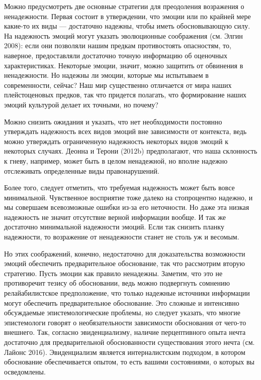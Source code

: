 \documentclass[11pt]{book}
\begin{document}
Можно предусмотреть две основные стратегии для преодоления возражения о ненадежности. Первая состоит в утверждении, что эмоции или по крайней мере какие-то их виды --- достаточно надежны, чтобы иметь обосновывающую силу. На надежность эмоций могут указать эволюционные соображения (см. Элгин 2008): если они позволяли нашим предкам противостоять опасностям, то, наверное, предоставляли достаточно точную информацию об оценочных характеристиках. Некоторые эмоции, значит, можно защитить от обвинения в ненадежности. Но надежны ли эмоции, которые мы испытываем в современности, сейчас? Наш мир существенно отличается от мира наших плейстоценовых предков, так что придется полагать, что формирование наших эмоций культурой делает их точными, но почему?

Можно снизить ожидания и указать, что нет необходимости постоянно утверждать надежность всех видов эмоций вне зависимости от контекста, ведь можно утверждать ограниченную надежность некоторых видов эмоций к некоторых случаях. Деонна и Терони (2012b) предполагают, что наша склонность к гневу, например, может быть в целом ненадежной, но вполне надежно отслеживать определенные виды правонарушений.

Более того, следует отметить, что требуемая надежность может быть вовсе минимальной. Чувственное восприятие тоже далеко на стопроцентно надежно, и мы совершаем всевозможные ошибки из-за его неточности. Но даже эта низкая надежность не значит отсутствие верной информации вообще. И так же достаточно минимальной надежности эмоций. Если так снизить планку надежности, то возражение от ненадежности станет не столь уж и весомым.

Но этих соображений, конечно, недостаточно для доказательства возможности эмоций обеспечить предварительное обоснование, так что рассмотрим вторую стратегию. Пусть эмоции как правило ненадежны. Заметим, что это не противоречит тезису об обосновании, ведь можно подвергнуть сомнению релайабилистское предположение, что только надежные источники информации могут обеспечить предварительное обоснование. Это сложные и интенсивно обсуждаемые эпистемологические проблемы, но следует указать, что многие эпистемологи говорят о необязательности зависимости обоснования от чего-то внешнего. Так, согласно эвиденциализму, наличие перцептивного опыта нечта достаточно для предварительной обоснованности существования этого нечта (см. Лайонс 2016). Эвиденциализм является интерналистским подходом, в котором обоснование обеспечивается опытом, то есть вашими состояниями, о которых вы осведомлены.
\end{document}
